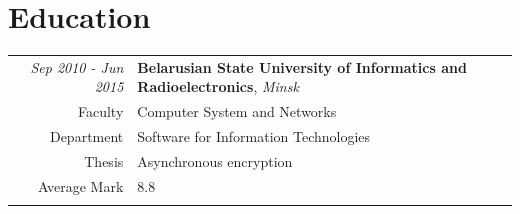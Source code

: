 \documentclass[a4paper,12pt]{article}
\begin{document}
\section{Education}
\begin{tabular}[\textwidth]{r|p{11cm}}
    \em Sep 2010 - Jun 2015  & \textbf{Belarusian State University of Informatics and Radioelectronics}, \textit{Minsk} \\
    Faculty & Computer System and Networks\\ 
    Department & Software for Information Technologies\\
    Thesis & Asynchronous encryption\\
    Average Mark & 8.8 \\
    \multicolumn{2}{c}{} \\	
\end{tabular}
\end{document}
